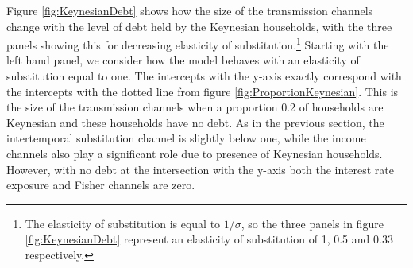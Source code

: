 \documentclass[titlepage]{\econtex}\newcommand{\texname}{ConsumptionHeterogeneity}
\begin{document}
Figure \ref{fig:KeynesianDebt} shows how the size of the transmission channels change with the level of debt held by the Keynesian households, with the three panels showing this for decreasing elasticity of substitution.\footnote{The elasticity of substitution is equal to $1/\sigma$, so the three panels in figure \ref{fig:KeynesianDebt} represent an elasticity of substitution of 1, 0.5 and 0.33 respectively.} Starting with the left hand panel, we consider how the model behaves with an elasticity of substitution equal to one. The intercepts with the y-axis exactly correspond with the intercepts with the dotted line from figure \ref{fig:ProportionKeynesian}. This is the size of the transmission channels when a proportion 0.2 of households are Keynesian and these households have no debt. As in the previous section, the intertemporal substitution channel is slightly below one, while the income channels also play a significant role due to presence of Keynesian households. However, with no debt at the intersection with the y-axis both the interest rate exposure and Fisher channels are zero.
\end{document}
